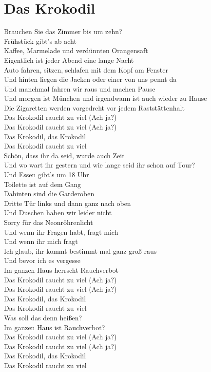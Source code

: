 \documentclass[]{book}
\begin{document}
\hypertarget{das-krokodil-1}{%
\section{Das Krokodil}\label{das-krokodil-1}}

Brauchen Sie das Zimmer bis um zehn?\\
Frühstück gibt's ab acht\\
Kaffee, Marmelade und verdünnten Orangensaft\\
Eigentlich ist jeder Abend eine lange Nacht\\
Auto fahren, sitzen, schlafen mit dem Kopf am Fenster\\
Und hinten liegen die Jacken oder einer von uns pennt da\\
Und manchmal fahren wir raus und machen Pause\\
Und morgen ist München und irgendwann ist auch wieder zu Hause\\
Die Zigaretten werden vorgedreht vor jedem Raststättenhalt\\
Das Krokodil raucht zu viel (Ach ja?)\\
Das Krokodil raucht zu viel (Ach ja?)\\
Das Krokodil, das Krokodil\\
Das Krokodil raucht zu viel\\
Schön, dass ihr da seid, wurde auch Zeit\\
Und wo wart ihr gestern und wie lange seid ihr schon auf Tour?\\
Und Essen gibt's um 18 Uhr\\
Toilette ist auf dem Gang\\
Dahinten sind die Garderoben\\
Dritte Tür links und dann ganz nach oben\\
Und Duschen haben wir leider nicht\\
Sorry für das Neonröhrenlicht\\
Und wenn ihr Fragen habt, fragt mich\\
Und wenn ihr mich fragt\\
Ich glaub, ihr kommt bestimmt mal ganz groß raus\\
Und bevor ich es vergesse\\
Im ganzen Haus herrscht Rauchverbot\\
Das Krokodil raucht zu viel (Ach ja?)\\
Das Krokodil raucht zu viel (Ach ja?)\\
Das Krokodil, das Krokodil\\
Das Krokodil raucht zu viel\\
Was soll das denn heißen?\\
Im ganzen Haus ist Rauchverbot?\\
Das Krokodil raucht zu viel (Ach ja?)\\
Das Krokodil raucht zu viel (Ach ja?)\\
Das Krokodil, das Krokodil\\
Das Krokodil raucht zu viel
\end{document}
